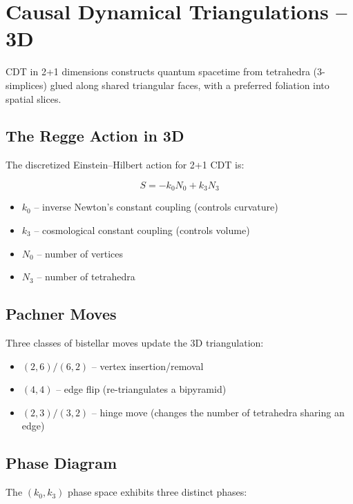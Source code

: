 \section{Causal Dynamical Triangulations -- 3D}

CDT in 2+1 dimensions constructs quantum spacetime from tetrahedra (3-simplices) glued along shared triangular faces, with a preferred foliation into spatial slices.

\subsection{The Regge Action in 3D}

The discretized Einstein--Hilbert action for 2+1 CDT is:

\begin{equation}
S = -k_0 N_0 + k_3 N_3
\end{equation}

\begin{itemize}
\item $k_0$ -- inverse Newton's constant coupling (controls curvature)
\item $k_3$ -- cosmological constant coupling (controls volume)
\item $N_0$ -- number of vertices
\item $N_3$ -- number of tetrahedra
\end{itemize}

\subsection{Pachner Moves}

Three classes of bistellar moves update the 3D triangulation:

\begin{itemize}
\item $(2,6)/(6,2)$ -- vertex insertion/removal
\item $(4,4)$ -- edge flip (re-triangulates a bipyramid)
\item $(2,3)/(3,2)$ -- hinge move (changes the number of tetrahedra sharing an edge)
\end{itemize}

\subsection{Phase Diagram}

The $(k_0, k_3)$ phase space exhibits three distinct phases:

